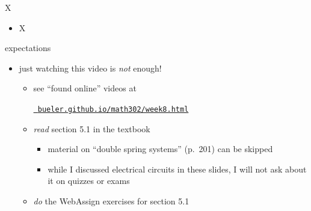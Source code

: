\documentclass[urlcolor=blue]{beamer}
\begin{document}
\begin{frame}{X}

\begin{itemize}
\item X
\end{itemize}
\end{frame}


\begin{frame}{expectations}

\begin{itemize}
\item just watching this video is \emph{not} enough!
     \begin{itemize}
     \item see ``found online'' videos at

     \centerline{\href{https://bueler.github.io/math302/week8.html}{\tt \color{cyan} bueler.github.io/math302/week8.html}}
     \item \emph{read} section 5.1 in the textbook
         \begin{itemize}
         \item material on ``double spring systems'' (p.~201) can be skipped
         \item while I discussed electrical circuits in these slides, I will not ask about it on quizzes or exams
         \end{itemize}
     \item \emph{do} the WebAssign exercises for section 5.1
     \end{itemize}
\end{itemize}
\end{frame}
\end{document}
